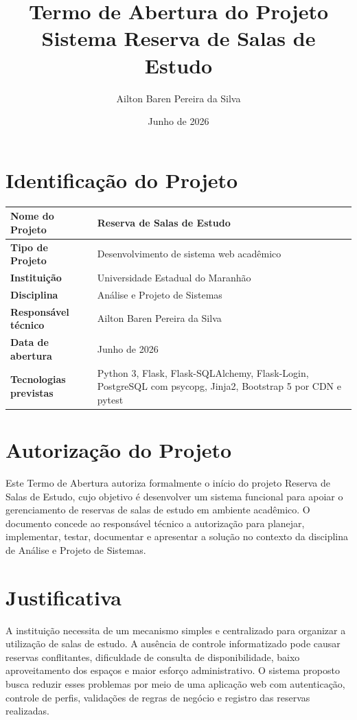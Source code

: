 \documentclass[12pt,a4paper]{article}
\title{\textbf{Termo de Abertura do Projeto}\\Sistema Reserva de Salas de Estudo}
\author{Ailton Baren Pereira da Silva}
\date{Junho de 2026}
\begin{document}
\maketitle

\section{Identificação do Projeto}

\begin{longtable}{|p{5cm}|p{10cm}|}
\hline
\textbf{Nome do Projeto} & Reserva de Salas de Estudo \\ \hline
\textbf{Tipo de Projeto} & Desenvolvimento de sistema web acadêmico \\ \hline
\textbf{Instituição} & Universidade Estadual do Maranhão \\ \hline
\textbf{Disciplina} & Análise e Projeto de Sistemas \\ \hline
\textbf{Responsável técnico} & Ailton Baren Pereira da Silva \\ \hline
\textbf{Data de abertura} & Junho de 2026 \\ \hline
\textbf{Tecnologias previstas} & Python 3, Flask, Flask-SQLAlchemy, Flask-Login, PostgreSQL com psycopg, Jinja2, Bootstrap 5 por CDN e pytest \\ \hline
\end{longtable}

\section{Autorização do Projeto}

Este Termo de Abertura autoriza formalmente o início do projeto Reserva de Salas de Estudo, cujo objetivo é desenvolver um sistema funcional para apoiar o gerenciamento de reservas de salas de estudo em ambiente acadêmico. O documento concede ao responsável técnico a autorização para planejar, implementar, testar, documentar e apresentar a solução no contexto da disciplina de Análise e Projeto de Sistemas.

\section{Justificativa}

A instituição necessita de um mecanismo simples e centralizado para organizar a utilização de salas de estudo. A ausência de controle informatizado pode causar reservas conflitantes, dificuldade de consulta de disponibilidade, baixo aproveitamento dos espaços e maior esforço administrativo. O sistema proposto busca reduzir esses problemas por meio de uma aplicação web com autenticação, controle de perfis, validações de regras de negócio e registro das reservas realizadas.
\end{document}
